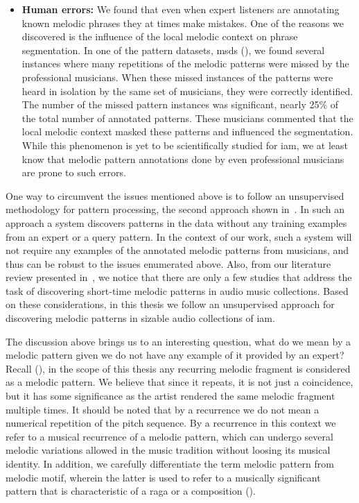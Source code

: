 \begin{itemize}
	\item \textbf{Human errors:} We found that even when expert listeners are annotating known melodic phrases they at times make mistakes. One of the reasons we discovered is the influence of the local melodic context on phrase segmentation. In one of the pattern datasets, \acrshort{msds} (), we found several instances where many repetitions of the melodic patterns were missed by the professional musicians. When these missed instances of the patterns were heard in isolation by the same set of musicians, they were correctly identified. The number of the missed pattern instances was significant, nearly 25\% of the total number of annotated patterns. These musicians commented that the local melodic context masked these patterns and influenced the segmentation. While this phenomenon is yet to be scientifically studied for \gls{iam}, we at least know that melodic pattern annotations done  by even professional musicians are prone to such errors. 			
\end{itemize}

One way to circumvent the issues mentioned above is to follow an unsupervised methodology for pattern processing, the second approach shown in~. In such an approach a system discovers patterns in the data without any training examples from an expert or a query pattern. In the context of our work, such a system will not require any examples of the annotated melodic patterns from musicians, and thus can be robust to the issues enumerated above. Also, from our literature review presented in~, we notice that there are only a few studies that address the task of discovering short-time melodic patterns in audio music collections. Based on these considerations, in this thesis we follow an unsupervised approach for discovering melodic patterns in sizable audio collections of \gls{iam}. 

The discussion above brings us to an interesting question, what do we mean by a melodic pattern given we do not have any example of it provided by an expert? Recall (), in the scope of this thesis any recurring melodic fragment is considered as a melodic pattern. We believe that since it repeats, it is not just a coincidence, but it has some significance as the artist rendered the same melodic fragment multiple times. It should be noted that by a recurrence we do not mean a numerical repetition of the pitch sequence. By a recurrence in this context we refer to a musical recurrence of a melodic pattern, which can undergo several melodic variations allowed in the music tradition without loosing its musical identity. In addition, we carefully differentiate the term melodic pattern from melodic motif, wherein the latter is used to refer to a musically significant pattern that is characteristic of a \gls{raga} or a composition (). 

